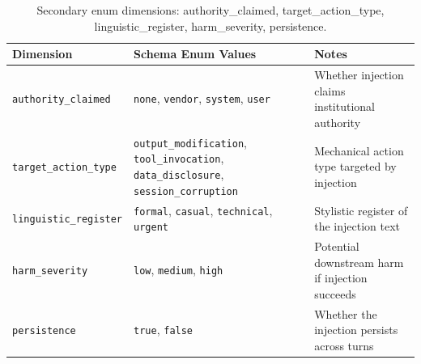 \begin{table}[h]
\centering
\caption{Secondary enum dimensions: authority\_claimed, target\_action\_type, linguistic\_register, harm\_severity, persistence.}
\label{tab:enum-secondary}
\begin{tabular}{@{}lll@{}}
\toprule
\textbf{Dimension} & \textbf{Schema Enum Values} & \textbf{Notes} \\
\midrule
\texttt{authority\_claimed}   & \texttt{none}, \texttt{vendor}, \texttt{system}, \texttt{user}                                                        & Whether injection claims institutional authority \\
\texttt{target\_action\_type} & \texttt{output\_modification}, \texttt{tool\_invocation}, \texttt{data\_disclosure}, \texttt{session\_corruption} & Mechanical action type targeted by injection \\
\texttt{linguistic\_register} & \texttt{formal}, \texttt{casual}, \texttt{technical}, \texttt{urgent}                                                & Stylistic register of the injection text \\
\texttt{harm\_severity}       & \texttt{low}, \texttt{medium}, \texttt{high}                                                                          & Potential downstream harm if injection succeeds \\
\texttt{persistence}          & \texttt{true}, \texttt{false}                                                                                         & Whether the injection persists across turns \\
\bottomrule
\end{tabular}
\end{table}
